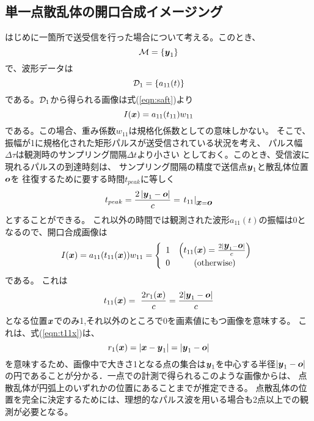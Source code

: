 \documentclass[10pt,a4j,dvipdfmx]{jarticle}
\begin{document}
\subsection{単一点散乱体の開口合成イメージング}
はじめに一箇所で送受信を行った場合について考える。このとき、
\begin{equation}
	{\cal M} =\left\{ 
		\mbox{\boldmath $y$}_1
	\right\}
	\label{eqn:M1}
\end{equation}
で、波形データは
\begin{equation}
	{\cal D}_1=\left\{ a_{11}(t)\right\}
	\label{eqn:}
\end{equation}
である。${\cal D}_1$から得られる画像は式(\ref{eqn:saft})より
\begin{equation}
	I(\mbox{\boldmath $x$})=a_{11}(t_{11})w_{11}
	\label{eqn:}
\end{equation}
である。この場合、重み係数$w_{11}$は規格化係数としての意味しかない。
そこで、振幅が1に規格化された矩形パルスが送受信されている状況を考え、
パルス幅$\Delta \tau$は観測時のサンプリング間隔$\Delta t$より小さい
としておく。このとき、受信波に現れるパルスの到達時刻は、
サンプリング間隔の精度で送信点$\mbox{\boldmath $y$}_1$と散乱体位置$\mbox{\boldmath $o$}$を
往復するために要する時間$t_{peak}$に等しく
\begin{equation}
	t_{peak}
	=
	\frac{2\left| \mbox{\boldmath $y$}_1 -\mbox{\boldmath $o$}\right|}{c}
	=
	\left. t_{11} \right|_{\mbox{\boldmath $x$}=\mbox{\boldmath $o$}}
	\label{eqn:t_peak}
\end{equation}
とすることができる。
これ以外の時間では観測された波形$a_{11}(t)$の振幅は0となるので、開口合成画像は
\begin{equation}
	I(\mbox{\boldmath $x$})=a_{11}(t_{11}(\mbox{\boldmath $x$}))w_{11}=\left\{
	\begin{array}{cc}
		1 &  \left(t_{11}(\mbox{\boldmath $x$})=\frac{2|\mbox{\boldmath $y$}_1-\mbox{\boldmath $o$}|}{c}\right)\\
		0 &  ({\rm otherwise})
	\end{array}
	\right.
	\label{eqn:}
\end{equation}
である。 これは
\begin{equation}
	t_{11}(\mbox{\boldmath $x$})=\
	\frac{2r_1(\mbox{\boldmath $x$})}{c}
	=
	\frac{2|\mbox{\boldmath $y$}_1-\mbox{\boldmath $o$}|}{c}
	\label{eqn:t11x}
\end{equation}
となる位置$\mbox{\boldmath $x$}$でのみ1,それ以外のところで0を画素値にもつ画像を意味する。
これは、式(\ref{eqn:t11x})は、
\begin{equation}
	r_1(\mbox{\boldmath $x$})
	=
	|\mbox{\boldmath $x$}-\mbox{\boldmath $y$}_1|
	=
	|\mbox{\boldmath $y$}_1-\mbox{\boldmath $o$}|
	\label{eqn:}
\end{equation}
を意味するため、画像中で大きさ1となる点の集合は$\mbox{\boldmath $y$}_1$を中心する半径$|\mbox{\boldmath $y$}_1-\mbox{\boldmath $o$}|$
の円であることが分かる．一点での計測で得られるこのような画像からは、
点散乱体が円弧上のいずれかの位置にあることまでが推定できる。
点散乱体の位置を完全に決定するためには、理想的なパルス波を用いる場合も2点以上での観測が必要となる。
\end{document}
